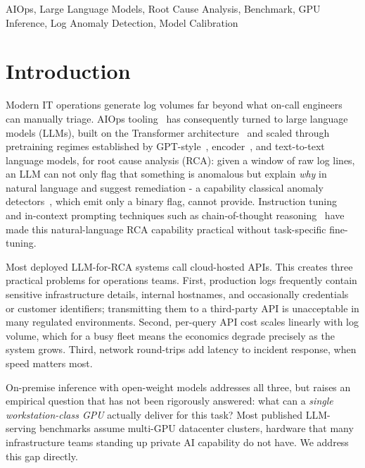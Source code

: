\documentclass[10pt,conference]{IEEEtran}
\begin{document}
\begin{IEEEkeywords}
AIOps, Large Language Models, Root Cause Analysis, Benchmark, GPU Inference, Log Anomaly Detection, Model Calibration
\end{IEEEkeywords}

\section{Introduction}

Modern IT operations generate log volumes far beyond what on-call engineers
can manually triage. AIOps tooling~\cite{dang2019aiops} has consequently
turned to large language models (LLMs), built on the Transformer
architecture~\cite{vaswani2017attention} and scaled through pretraining
regimes established by GPT-style~\cite{radford2019gpt2,brown2020gpt3},
encoder~\cite{devlin2019bert}, and text-to-text~\cite{raffel2020t5}
language models, for root cause analysis (RCA): given a window of raw log
lines, an LLM can not only flag that something is anomalous but explain
\emph{why} in natural language and suggest remediation - a capability
classical anomaly detectors~\cite{chandola2009anomaly}, which emit only a
binary flag, cannot provide. Instruction tuning~\cite{ouyang2022instructgpt}
and in-context prompting techniques such as chain-of-thought
reasoning~\cite{wei2022cot} have made this natural-language RCA capability
practical without task-specific fine-tuning.

Most deployed LLM-for-RCA systems call cloud-hosted APIs. This creates
three practical problems for operations teams. First, production logs
frequently contain sensitive infrastructure details, internal hostnames,
and occasionally credentials or customer identifiers; transmitting them to
a third-party API is unacceptable in many regulated environments. Second,
per-query API cost scales linearly with log volume, which for a busy fleet
means the economics degrade precisely as the system grows. Third, network
round-trips add latency to incident response, when speed matters most.

On-premise inference with open-weight models addresses all three, but
raises an empirical question that has not been rigorously answered: what
can a \emph{single workstation-class GPU} actually deliver for this task?
Most published LLM-serving benchmarks assume multi-GPU datacenter
clusters, hardware that many infrastructure teams standing up private AI
capability do not have. We address this gap directly.
\end{document}
